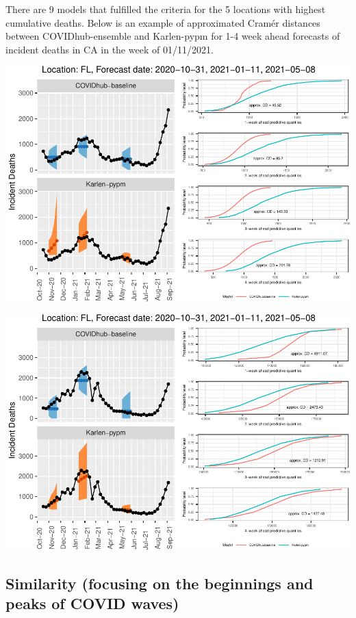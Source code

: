 \documentclass[
]{article}
\begin{document}
There are 9 models that fulfilled the criteria for the 5 locations with
highest cumulative deaths. Below is an example of approximated Cramér
distances between COVIDhub-ensemble and Karlen-pypm for 1-4 week ahead
forecasts of incident deaths in CA in the week of 01/11/2021.

\begin{center}\includegraphics[width=0.8\linewidth,height=0.8\textheight]{cd_approx_2_files/figure-latex/unnamed-chunk-4-1} \end{center}

\begin{center}\includegraphics[width=0.8\linewidth,height=0.8\textheight]{cd_approx_2_files/figure-latex/unnamed-chunk-5-1} \end{center}

\hypertarget{similarity-focusing-on-the-beginnings-and-peaks-of-covid-waves}{%
\subsection{Similarity (focusing on the beginnings and peaks of COVID
waves)}\label{similarity-focusing-on-the-beginnings-and-peaks-of-covid-waves}}
\end{document}
